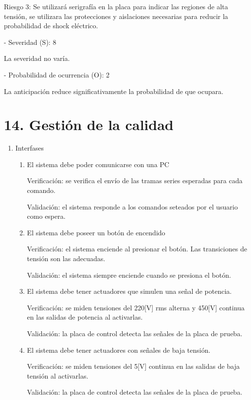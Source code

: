 \documentclass[
11pt, %
codirector, %
]{charter}
\begin{document}
Riesgo 3: Se utilizará serigrafía en la placa para indicar las regiones de alta tensión, se utilizara las protecciones y aislaciones necesarias para reducir la probabilidad de shock eléctrico.

- Severidad (S): 8

La severidad no varía.

- Probabilidad de ocurrencia (O): 2

La anticipación reduce significativamente la probabilidad de que ocupara.


\section{14. Gestión de la calidad}
\label{sec:calidad}

\begin{enumerate}
	\item Interfases
	      \begin{enumerate}
		      \item El sistema debe poder comunicarse con una PC

		            Verificación: se verifica el envío de las tramas series esperadas para cada comando.

		            Validación: el sistema responde a los comandos seteados por el usuario como espera.
		      \item El sistema debe poseer un botón de encendido

		            Verificación: el sistema enciende al presionar el botón. Las transiciones de tensión son las adecuadas.

		            Validación: el sistema siempre enciende cuando se presiona el botón.

		      \item El sistema debe tener actuadores que simulen una señal de potencia.

		            Verificación: se miden tensiones del 220[V] rms alterna y 450[V] continua en las salidas de potencia al activarlas.

		            Validación: la placa de control detecta las señales de la placa de prueba.
		      \item El sistema debe tener actuadores con señales de baja tensión.

		            Verificación: se miden tensiones del 5[V] continua en las salidas de baja tensión al activarlas.

		            Validación: la placa de control detecta las señales de la placa de prueba.


\end{enumerate}
\end{enumerate}
\end{document}

